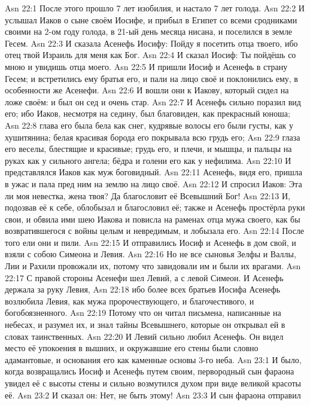 \vs Asn 22:1
После этого прошло 7 лет изобилия, и настало 7 лет голода.
\vs Asn 22:2
И услышал Иаков о сыне своём Иосифе,
и прибыл в Египет со всеми сродниками своими на 2-ом году голода, в
21-ый день месяца нисана, и поселился в земле Гесем.
\vs Asn 22:3
И сказала Асенефь Иосифу:
Пойду я посетить отца твоего, ибо отец твой Израиль для меня как Бог.
\vs Asn 22:4
И сказал Иосиф: Ты пойдёшь со мною и увидишь отца моего.
\vs Asn 22:5
И пришли Иосиф и Асенефь в
страну Гесем; и встретились ему братья его,
и пали на лицо своё и поклонились
ему, в особенности же Асенефи.
\vs Asn 22:6
И вошли они к Иакову,
который сидел на ложе своём: и был он сед и очень стар.
\vs Asn 22:7
И Асенефь сильно поразил вид
его; ибо Иаков, несмотря на седину, был благовиден, как прекрасный юноша;
\vs Asn 22:8
глава его была бела как
снег, кудрявые волосы его были густы, как у хушитянина;
белая красивая борода его покрывала всю грудь его;
\vs Asn 22:9
глаза его веселы,
блестящие и красивые; грудь его, и плечи, и мышцы, и пальцы на руках как у
сильного ангела; бёдра и голени его как у нефилима.
\vs Asn 22:10
И представлялся Иаков как
муж боговидный.
\vs Asn 22:11
Асенефь, видя его, пришла в
ужас и пала пред ним на землю на лицо своё.
\vs Asn 22:12
И спросил Иаков: Эта ли
моя невестка, жена твоя? Да благословит её Всевышний Бог!
\vs Asn 22:13
И, подозвав её к себе,
облобызал и благословил её; также и Асенефь простёрла руки свои, и обвила ими
шею Иакова и повисла на раменах отца мужа своего, как бы возвратившегося с войны
целым и невредимым, и лобызала его.
\vs Asn 22:14
После того ели они и пили.
\vs Asn 22:15
И отправились Иосиф и
Асенефь в дом свой, и взяли с собою Симеона и Левия.
\vs Asn 22:16
Но не все сыновья Зелфы и
Валлы, Лии и Рахили провожали их, потому что завидовали им и были их врагами.
\vs Asn 22:17
С правой стороны Асенефи
шел Левий, а с левой Симеон. И Асенефь держала за руку Левия,
\vs Asn 22:18
ибо более всех братьев
Иосифа Асенефь возлюбила Левия, как мужа пророчествующего, и благочестивого, и
богобоязненного.
\vs Asn 22:19
Потому что он читал
письмена, написанные на небесах, и разумел их, и знал тайны Всевышнего, которые
он открывал ей в словах таинственных.
\vs Asn 22:20
И Левий сильно любил
Асенефь. Он видел место её упокоения в вышних, и окружавшие его стены были
словно адамантовые, и основания его как каменные основы 3-го неба.
\vs Asn 23:1
И было, когда возвращались
Иосиф и Асенефь путем своим, первородный сын фараона увидел её с высоты стены и
сильно возмутился духом при виде великой красоты её.
\vs Asn 23:2
И сказал он: Нет, не быть этому!
\vs Asn 23:3
И сын фараона отправил
